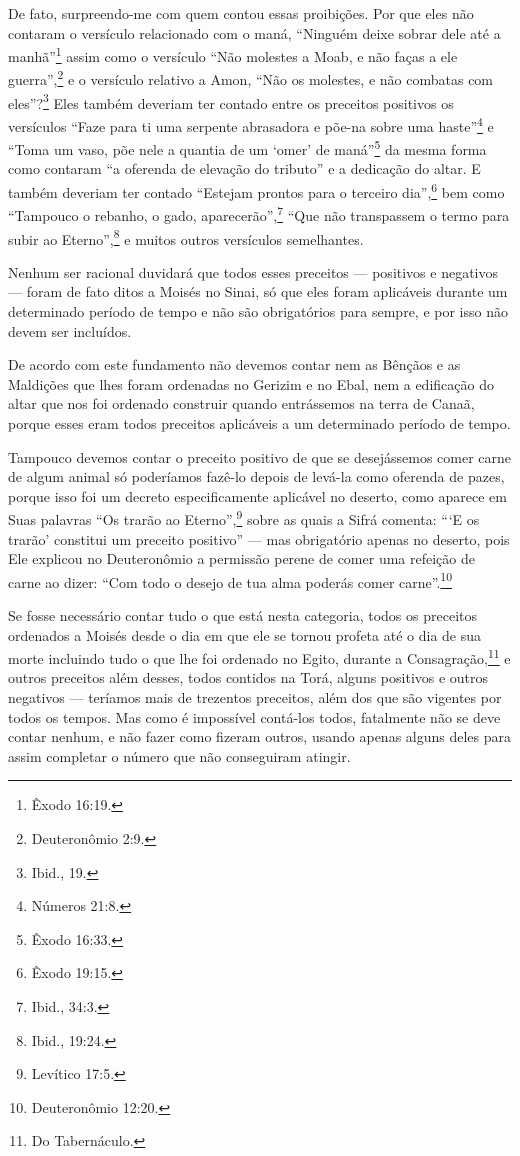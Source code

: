 De fato, surpreendo-me com quem contou essas proibições. Por que eles
não contaram o versículo relacionado com o maná, ``Ninguém deixe sobrar
dele até a manhã''\footnote{Êxodo 16:19.} assim como o versículo ``Não molestes a
Moab, e não faças a ele guerra'',\footnote{Deuteronômio 2:9.} e o versículo
relativo a Amon, ``Não os molestes, e não combatas com eles''?\footnote{Ibid.,
19.} Eles também deveriam ter contado entre os preceitos positivos os
versículos ``Faze para ti uma serpente abrasadora e põe-na sobre uma
haste''\footnote{Números 21:8.} e ``Toma um vaso, põe nele a quantia de um `omer'
de maná''\footnote{Êxodo 16:33.} da mesma forma como contaram
``a oferenda de elevação do tributo'' e a dedicação do altar. E também
deveriam ter contado ``Estejam prontos para o terceiro dia'',\footnote{Êxodo
19:15.} bem como ``Tampouco o rebanho, o gado, aparecerão'',\footnote{Ibid.,
34:3.} ``Que não transpassem o termo para subir ao Eterno'',\footnote{Ibid.,
19:24.} e muitos outros versículos semelhantes.

Nenhum ser racional duvidará que todos esses preceitos --- positivos e
negativos --- foram de fato ditos a Moisés no Sinai, só que eles foram
aplicáveis durante um determinado período de tempo e não são
obrigatórios para sempre, e por isso não devem ser incluídos.

De acordo com este fundamento não devemos contar nem as Bênçãos e as Maldições que lhes foram ordenadas no Gerizim e no Ebal, nem a
edificação do altar que nos foi ordenado construir quando entrássemos
na terra de Canaã, porque esses eram todos preceitos aplicáveis a um
determinado período de tempo.

Tampouco devemos contar o preceito positivo de que se desejássemos
comer carne de algum animal só poderíamos fazê-lo depois de levá-la
como oferenda de pazes, porque isso foi um decreto especificamente
aplicável no deserto, como aparece em Suas palavras ``Os trarão ao
Eterno'',\footnote{Levítico 17:5.} sobre as quais a Sifrá comenta: ```E os
trarão' constitui um preceito positivo'' --- mas obrigatório apenas no
deserto, pois Ele explicou no Deuteronômio a permissão perene de comer
uma refeição de carne ao dizer: ``Com todo o desejo de tua alma poderás
comer carne''.\footnote{Deuteronômio 12:20.}

Se fosse necessário contar tudo o que está nesta categoria, todos os
preceitos ordenados a Moisés desde o dia em que ele se tornou profeta
até o dia de sua morte incluindo tudo o que lhe foi ordenado no Egito,
durante a Consagração,\footnote{Do Tabernáculo.} e outros preceitos além
desses, todos contidos na Torá, alguns positivos e outros negativos
--- teríamos mais de trezentos preceitos, além dos que são vigentes por
todos os tempos. Mas como é impossível contá-los todos, fatalmente não
se deve contar nenhum, e não fazer como fizeram outros, usando apenas
alguns deles para assim completar o número que não conseguiram atingir.

